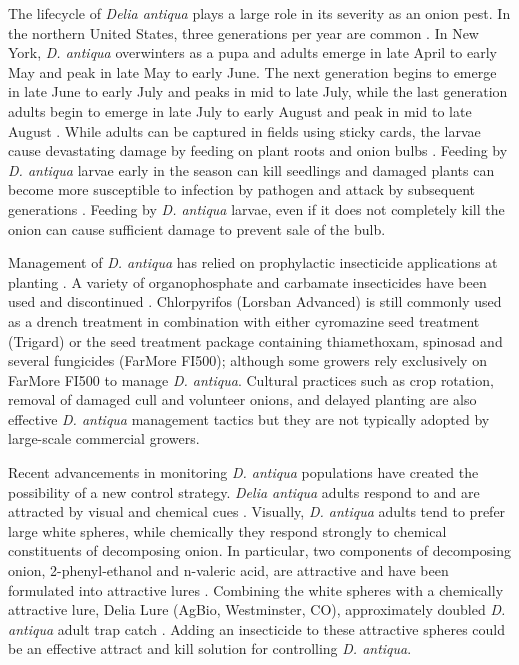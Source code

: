 \documentclass[num-refs]{wiley-article}
\begin{document}
The lifecycle of \textit{Delia antiqua} plays a large role in its severity as an onion pest.  In the northern United States, three generations per year are common \cite{eckenrode1975population, hoepting2004insecticide}. In New York, \textit{D. antiqua} overwinters as a pupa and adults emerge in late April to early May and peak in late May to early June. The next generation begins to emerge in late June to early July and peaks in mid to late July, while the last generation adults begin to emerge in late July to early August and peak in mid to late August \citep{nault2011delaying}. While adults can be captured in fields using sticky cards, the larvae cause devastating damage by feeding on plant roots and onion bulbs \citep{nault2006onion, nault2006performance}. Feeding by \textit{D. antiqua} larvae early in the season can kill seedlings and damaged plants can become more susceptible to infection by pathogen and attack by subsequent generations \citep{eckenrode1986impact,nault2006performance}.  Feeding by \textit{D. antiqua} larvae, even if it does not completely kill the onion can cause sufficient damage to prevent sale of the bulb.   

Management of \textit{D. antiqua} has relied on prophylactic insecticide applications at planting \citep{nault2006performance}. A variety of organophosphate and carbamate insecticides have been used and discontinued \citep{nault2006performance}. Chlorpyrifos (Lorsban Advanced) is still commonly used as a drench treatment in combination with either cyromazine seed treatment (Trigard) \citep{nault2006performance,nault2006onion} or the seed treatment package containing thiamethoxam, spinosad and several fungicides (FarMore FI500); although some growers rely exclusively on FarMore FI500 to manage \textit{D. antiqua}. Cultural practices such as crop rotation, removal of damaged cull and volunteer onions, and delayed planting are also effective \textit{D. antiqua} management tactics \citep{martinson1988dispersal,finch1985influence,nault2011delaying} but they are not typically adopted by large-scale commercial growers.   

Recent advancements in monitoring \textit{D. antiqua} populations have created the possibility of a new control strategy. \textit{Delia antiqua} adults respond to and are attracted by visual and chemical cues \citep{harris1988host,harris1983color,thomingdeveloping,otto2000development}. Visually, \textit{D. antiqua} adults tend to prefer large white spheres, while chemically they respond strongly to chemical constituents of decomposing onion. In particular, two components of decomposing onion, 2-phenyl-ethanol and n-valeric acid, are attractive and have been formulated into attractive lures \citep{ishikawa1984mixture,ishikawa1987controlled,kuhar2006field}. Combining the white spheres with a chemically attractive lure, Delia Lure (AgBio, Westminster, CO), approximately doubled \textit{D. antiqua} adult trap catch \citep{willett2019}. Adding an insecticide to these attractive spheres could be an effective attract and kill solution for controlling \textit{D. antiqua}.
\end{document}
